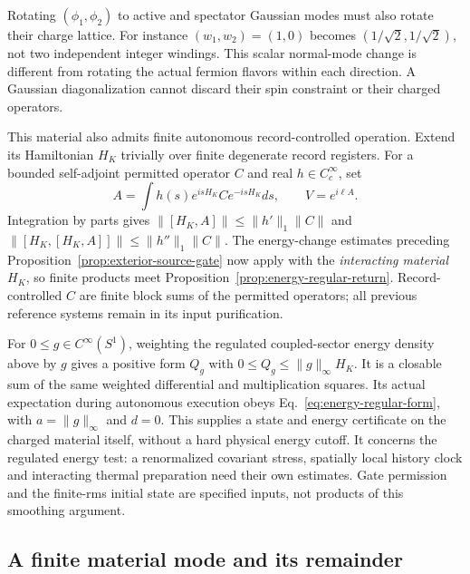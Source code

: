 Rotating $(\phi_1,\phi_2)$ to active and spectator Gaussian modes
must also rotate their charge lattice. For instance $(w_1,w_2)=(1,0)$
becomes $(1/\sqrt2,1/\sqrt2)$, not two independent integer windings.
This scalar normal-mode change is different from rotating the actual
fermion flavors within each direction. A Gaussian diagonalization
cannot discard their spin constraint or their charged operators.

This material also admits finite autonomous record-controlled operation.
Extend its Hamiltonian $H_K$ trivially over finite degenerate record
registers. For a bounded self-adjoint permitted operator $C$ and
real $h\in C_c^\infty$, set
\[
 A=\int h(s)e^{isH_K}Ce^{-isH_K}ds,\qquad V=e^{i\ell A}.
\]
Integration by parts gives
$\|[H_K,A]\|\le\|h'\|_1\|C\|$ and
$\|[H_K,[H_K,A]]\|\le\|h''\|_1\|C\|$.
The energy-change estimates preceding
Proposition~\ref{prop:exterior-source-gate} now apply with the
\emph{interacting material} $H_K$, so finite products meet
Proposition~\ref{prop:energy-regular-return}.
Record-controlled $C$ are finite block sums of the permitted operators;
all previous reference systems remain in its input purification.

For $0\le g\in C^\infty(S^1)$, weighting the regulated coupled-sector
energy density above by $g$ gives a positive form $Q_g$ with
$0\le Q_g\le\|g\|_\infty H_K$. It is a closable sum of the same
weighted differential and multiplication squares. Its actual
expectation during autonomous execution obeys
Eq.~\eqref{eq:energy-regular-form}, with
$a=\|g\|_\infty$ and $d=0$.
This supplies a state and energy certificate on the charged material
itself, without a hard physical energy cutoff. It concerns the
regulated energy test: a renormalized covariant stress, spatially
local history clock and interacting thermal preparation need their
own estimates. Gate permission and the finite-rms initial state are
specified inputs, not products of this smoothing argument.

\subsection{A finite material mode and its remainder}
\label{sec:finite-material-mode}

